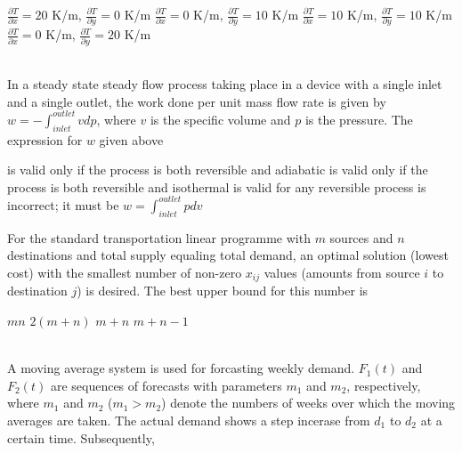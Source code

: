 \documentclass[addpoints,11pt]{exam}
\begin{document}
\begin{questions}
        \begin{oneparchoices}
            \choice $\frac{\partial{T}}{\partial{x}} = 20$ K/m, $\frac{\partial{T}}{\partial{y}} = 0$ K/m
            \choice $\frac{\partial{T}}{\partial{x}} = 0$ K/m, $\frac{\partial{T}}{\partial{y}} = 10$ K/m
            \choice $\frac{\partial{T}}{\partial{x}} = 10$ K/m, $\frac{\partial{T}}{\partial{y}} = 10$ K/m
            \choice $\frac{\partial{T}}{\partial{x}} = 0$ K/m, $\frac{\partial{T}}{\partial{y}} = 20$ K/m
        \end{oneparchoices}\\

        \question In a steady state steady flow process taking place in a device with a single inlet and a single outlet, the work done per unit mass flow rate is given by $w=-\int_{inlet}^{outlet} vdp$, where $v$ is the specific volume and $p$ is the pressure. The expression for $w$ given above\\

        \begin{choices}
            \choice is valid only if the process is both reversible and adiabatic
            \choice is valid only if the process is both reversible and isothermal
            \choice is valid for any reversible process
            \choice is incorrect; it must be $w=\int_{inlet}^{outlet} pdv$
        \end{choices}

        \question For the standard transportation linear programme with $m$ sources and $n$ destinations and total supply equaling total demand, an optimal solution (lowest cost) with the smallest number of non-zero $x_{ij}$ values (amounts from source $i$ to destination $j$) is desired. The best upper bound for this number is\\

        \begin{oneparchoices}
            \choice $mn$
            \choice $2(m+n)$
            \choice $m+n$
            \choice $m+n-1$
        \end{oneparchoices}\\

        \question A moving average system is used for forcasting weekly demand. $F_1(t)$ and $F_2(t)$ are sequences of forecasts with parameters $m_1$ and $m_2$, respectively, where $m_1$ and $m_2$ ($m_1>m_2$) denote the numbers of weeks over which the moving averages are taken. The actual demand shows a step incerase from $d_1$ to $d_2$ at a certain time. Subsequently,\\


\end{questions}
\end{document}
